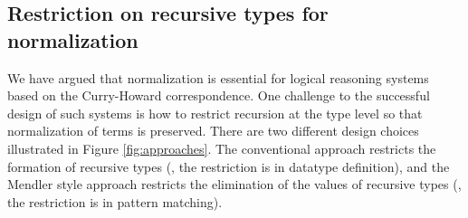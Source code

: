 \subsection{Restriction on recursive types for normalization}
\label{sec:relwork:other}
We have argued that normalization is essential for logical reasoning systems
based on the Curry-Howard correspondence. One challenge to the successful
design of such systems is how to restrict recursion at the type level
so that normalization of terms is preserved. 
There are two different
design choices illustrated in Figure \ref{fig:approaches}. 
The conventional approach restricts the formation
of recursive types (\ie, the restriction is in datatype definition), and
the Mendler style approach restricts the elimination
of the values of recursive types (\ie, the restriction is in pattern matching).


